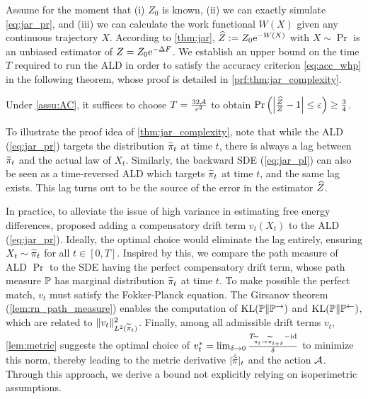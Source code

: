 Assume for the moment that (i) $Z_0$ is known, (ii) we can exactly simulate \cref{eq:jar_pr}, and (iii) we can calculate the work functional $W(X)$ given any continuous trajectory $X$. According to \cref{thm:jar}, $\Zh:=Z_0\e^{-W(X)}$ with $X\sim\Pr$ is an unbiased estimator of $Z=Z_0\e^{-\Delta F}$. We establish an upper bound on the time $T$ required to run the ALD in order to satisfy the accuracy criterion \cref{eq:acc_whp} in the following theorem, whose proof is detailed in \cref{prf:thm:jar_complexity}.

\begin{theorem}
    Under \cref{assu:AC}, it suffices to choose $T=\frac{32\cA}{\varepsilon^2}$ to obtain $\prob\ro{\abs{\frac{\Zh}{Z}-1}\le\varepsilon}\ge\frac{3}{4}$.
    \label{thm:jar_complexity}
\end{theorem}

To illustrate the proof idea of \cref{thm:jar_complexity}, note that while the ALD (\cref{eq:jar_pr}) targets the distribution $\pit_t$ at time $t$, there is always a lag between $\pit_t$ and the actual law of $X_t$. Similarly, the backward SDE (\cref{eq:jar_pl}) can also be seen as a time-reversed ALD which targets $\pit_t$ at time $t$, and the same lag exists. This lag turns out to be the source of the error in the estimator $\Zh$.

In practice, to alleviate the issue of high variance in estimating free energy differences, \cite{vaikuntanathan2008escorted} proposed adding a compensatory drift term $v_t(X_t)$ to the ALD (\cref{eq:jar_pr}). Ideally, the optimal choice would eliminate the lag entirely, ensuring $X_t\sim\pit_t$ for all $t\in[0,T]$. Inspired by this, we compare the path measure of ALD $\Pr$ to the SDE having the perfect compensatory drift term, whose path measure $\P$ has marginal distribution $\pit_t$ at time $t$. To make possible the perfect match, $v_t$ must satisfy the Fokker-Planck equation. The Girsanov theorem (\cref{lem:rn_path_measure}) enables the computation of $\kl(\P\|\Pr)$ and $\kl(\P\|\Pl)$, which are related to $\|v_t\|_{L^2(\pit_t)}^2$. Finally, among all admissible drift terms $v_t$, \cref{lem:metric} suggests the optimal choice of $v^*_t=\lim_{\delta\to0}\frac{T_{\pit_t\to\pit_{t+\delta}}-\id}{\delta}$ to minimize this norm, thereby leading to the metric derivative $|\dot\pit|_t$ and the action $\cA$. Through this approach, we derive a bound not explicitly relying on isoperimetric assumptions.

